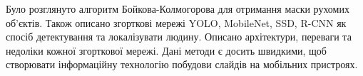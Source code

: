 \chapterConclusion

Було розглянуто алгоритм Бойкова-Колмогорова для
отримання маски рухомих об'єктів. Також описано
згорткові мережі YOLO, MobileNet, SSD, R-CNN
як спосіб детектування та локалізувати людину. 
Описано архітектури, переваги та недоліки кожної 
згорткової мережі.
Дані методи є досить швидкими, щоб 
створювати інформаційну технологію побудови слайдів на 
мобільних пристроях.